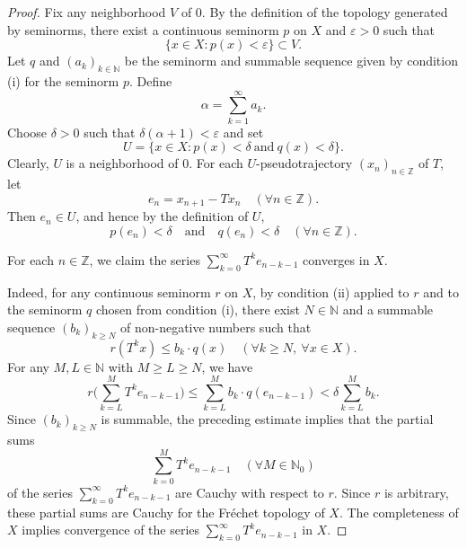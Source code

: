\documentclass[11pt]{amsart}
\theoremstyle{definition}
\theoremstyle{remark}
\theoremstyle{plain}
\begin{document}
\begin{proof}
Fix any neighborhood $V$ of \(0\).
By the definition of the topology generated by seminorms,
there exist a continuous seminorm \(p\) on \(X\) and
\(\varepsilon>0\) such that
\[
\{x\in X : p(x)<\varepsilon\}\subset V.
\]
Let \(q\) and \((a_k)_{k\in\mathbb{N}}\) be the seminorm and
summable sequence given by condition {\rm (i)} for the seminorm \(p\).  Define
\begin{equation}\label{eq:summ_a_k}
\alpha=\sum_{k=1}^{\infty}a_k .
\end{equation}
Choose \(\delta>0\) such that
\(\delta(\alpha+1)<\varepsilon\) and set
\[
U=\{x\in X:p(x)<\delta\ \text{and}\ q(x)<\delta\}.
\]
Clearly, $U$ is a neighborhood of $0$.
For each \(U\)-pseudotrajectory \((x_n)_{n\in\mathbb{Z}}\)
of \(T\), let
\begin{equation}\label{eq:def_e_n}
e_n=x_{n+1}-Tx_n \quad (\forall n\in \mathbb{Z}).
\end{equation}
Then \(e_n\in U\), and hence by the definition of $U$,
\begin{equation}\label{eq:q_en_small}
p(e_n)<\delta\quad\text{and}\quad q(e_n)<\delta
\quad(\forall n\in\mathbb{Z}).
\end{equation}

For each \(n\in\mathbb{Z}\), we claim the series
\(\sum_{k=0}^{\infty}T^k e_{n-k-1}\)
converges in $X$.

\medskip

Indeed, for any continuous seminorm \(r\) on \(X\),
by condition {\rm (ii)} applied to
\(r\) and to the seminorm \(q\) chosen from condition {\rm (i)},
there exist \(N\in\mathbb{N}\) and a summable sequence
\((b_k)_{k\ge N}\) of non-negative numbers such that
\[
r(T^k x)\le b_k\cdot q(x)
\quad(\forall k\ge N,\ \forall x\in X).
\]
For any \(M,L\in\mathbb{N}\) with \(M\ge L\ge N\), we have
\[
r\bigg(\sum_{k=L}^{M}T^k e_{n-k-1}\bigg)
\le
\sum_{k=L}^{M}b_k\cdot q(e_{n-k-1})
<
\delta\sum_{k=L}^{M}b_k .
\]
Since \((b_k)_{k\ge N}\) is summable, the preceding estimate implies that the partial sums
\[
\sum_{k=0}^{M}T^k e_{n-k-1}
\quad(\forall M\in\mathbb{N}_0)
\]
of the series
\(
\sum_{k=0}^{\infty}T^k e_{n-k-1}
\) are Cauchy with respect to \(r\).  Since \(r\) is arbitrary, these partial sums
are Cauchy for the Fr\'echet topology of \(X\).
The completeness of \(X\) implies convergence of the series
\(
\sum_{k=0}^{\infty}T^k e_{n-k-1}
\) in \(X\).


\end{proof}
\end{document}
